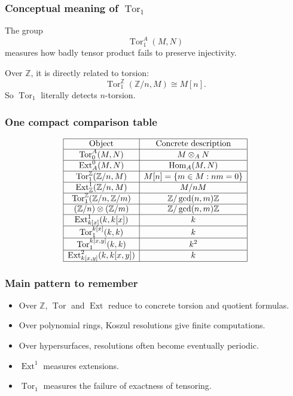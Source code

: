 \documentclass[12pt,a4paper]{article}
\theoremstyle{notespace}
\DeclareMathOperator{\Hom}{Hom}
\DeclareMathOperator{\Tor}{Tor}
\DeclareMathOperator{\Ext}{Ext}
\begin{document}
\subsubsection{Conceptual meaning of \(\Tor_1\)}

The group
\[
\Tor_1^A(M,N)
\]
measures how badly tensor product fails to preserve injectivity.

Over \(\mathbb Z\), it is directly related to torsion:
\[
\Tor_1^\mathbb Z(\mathbb Z/n,M)\cong M[n].
\]
So \(\Tor_1\) literally detects \(n\)-torsion.

\subsubsection{One compact comparison table}

\[
\begin{array}{|c|c|}
	\hline
	\text{Object} & \text{Concrete description} \\
	\hline
	\Tor_0^A(M,N) & M\otimes_A N \\
	\hline
	\Ext_A^0(M,N) & \Hom_A(M,N) \\
	\hline
	\Tor_1^\mathbb Z(\mathbb Z/n,M) & M[n]=\{m\in M:nm=0\} \\
	\hline
	\Ext_\mathbb Z^1(\mathbb Z/n,M) & M/nM \\
	\hline
	\Tor_1^\mathbb Z(\mathbb Z/n,\mathbb Z/m) & \mathbb Z/\gcd(n,m)\mathbb Z \\
	\hline
	(\mathbb Z/n)\otimes(\mathbb Z/m) & \mathbb Z/\gcd(n,m)\mathbb Z \\
	\hline
	\Ext_{k[x]}^1(k,k[x]) & k \\
	\hline
	\Tor_1^{k[x]}(k,k) & k \\
	\hline
	\Tor_1^{k[x,y]}(k,k) & k^2 \\
	\hline
	\Ext_{k[x,y]}^2(k,k[x,y]) & k \\
	\hline
\end{array}
\]

\subsubsection{Main pattern to remember}

\begin{itemize}
	\item Over \(\mathbb Z\), \(\Tor\) and \(\Ext\) reduce to concrete torsion and quotient formulas.
	\item Over polynomial rings, Koszul resolutions give finite computations.
	\item Over hypersurfaces, resolutions often become eventually periodic.
	\item \(\Ext^1\) measures extensions.
	\item \(\Tor_1\) measures the failure of exactness of tensoring.
\end{itemize}
\end{document}
